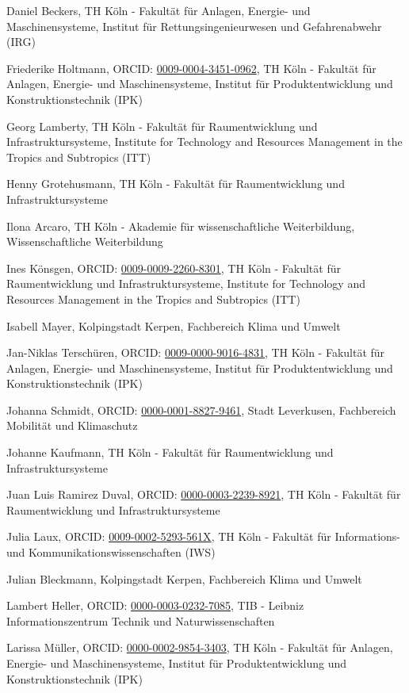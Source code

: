 \documentclass[
  letterpaper,
  DIV=11,
  numbers=noendperiod]{scrartcl}
\begin{document}
Daniel Beckers, TH Köln - Fakultät für Anlagen, Energie- und
Maschinensysteme, Institut für Rettungsingenieurwesen und Gefahrenabwehr
(IRG)

Friederike Holtmann, ORCID:
\href{https://orcid.org/0009-0004-3451-0962}{0009-0004-3451-0962}, TH
Köln - Fakultät für Anlagen, Energie- und Maschinensysteme, Institut für
Produktentwicklung und Konstruktionstechnik (IPK)

Georg Lamberty, TH Köln - Fakultät für Raumentwicklung und
Infrastruktursysteme, Institute for Technology and Resources Management
in the Tropics and Subtropics (ITT)

Henny Grotehusmann, TH Köln - Fakultät für Raumentwicklung und
Infrastruktursysteme

Ilona Arcaro, TH Köln - Akademie für wissenschaftliche Weiterbildung,
Wissenschaftliche Weiterbildung

Ines Könsgen, ORCID:
\href{https://orcid.org/0009-0009-2260-8301}{0009-0009-2260-8301}, TH
Köln - Fakultät für Raumentwicklung und Infrastruktursysteme, Institute
for Technology and Resources Management in the Tropics and Subtropics
(ITT)

Isabell Mayer, Kolpingstadt Kerpen, Fachbereich Klima und Umwelt

Jan-Niklas Terschüren, ORCID:
\href{https://orcid.org/0009-0000-9016-4831}{0009-0000-9016-4831}, TH
Köln - Fakultät für Anlagen, Energie- und Maschinensysteme, Institut für
Produktentwicklung und Konstruktionstechnik (IPK)

Johanna Schmidt, ORCID:
\href{https://orcid.org/0000-0001-8827-9461}{0000-0001-8827-9461}, Stadt
Leverkusen, Fachbereich Mobilität und Klimaschutz

Johanne Kaufmann, TH Köln - Fakultät für Raumentwicklung und
Infrastruktursysteme

Juan Luis Ramirez Duval, ORCID:
\href{https://orcid.org/0000-0003-2239-8921}{0000-0003-2239-8921}, TH
Köln - Fakultät für Raumentwicklung und Infrastruktursysteme

Julia Laux, ORCID:
\href{https://orcid.org/0009-0002-5293-561X}{0009-0002-5293-561X}, TH
Köln - Fakultät für Informations- und Kommunikationswissenschaften (IWS)

Julian Bleckmann, Kolpingstadt Kerpen, Fachbereich Klima und Umwelt

Lambert Heller, ORCID:
\href{https://orcid.org/0000-0003-0232-7085}{0000-0003-0232-7085}, TIB -
Leibniz Informationszentrum Technik und Naturwissenschaften

Larissa Müller, ORCID:
\href{https://orcid.org/0000-0002-9854-3403}{0000-0002-9854-3403}, TH
Köln - Fakultät für Anlagen, Energie- und Maschinensysteme, Institut für
Produktentwicklung und Konstruktionstechnik (IPK)
\end{document}

